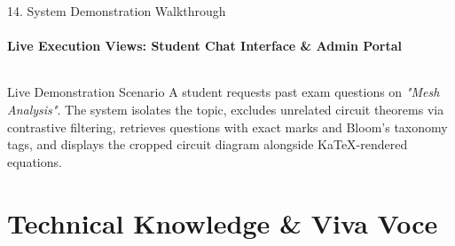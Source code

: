 \documentclass[aspectratio=169, 11pt]{beamer}
\begin{document}
\begin{frame}{14. System Demonstration Walkthrough}
    \framesubtitle{Live Execution Views: Student Chat Interface \& Admin Portal}
    \begin{columns}[T]
        \centering

        \centering
    \end{columns}
    \vspace{0.15cm}

    \begin{block}{Live Demonstration Scenario}
        \scriptsize
        A student requests past exam questions on \textit{"Mesh Analysis"}. The system isolates the topic, excludes unrelated circuit theorems via contrastive filtering, retrieves questions with exact marks and Bloom's taxonomy tags, and displays the cropped circuit diagram alongside KaTeX-rendered equations.
    \end{block}
\end{frame}

\section{Technical Knowledge \& Viva Voce}
\end{document}

